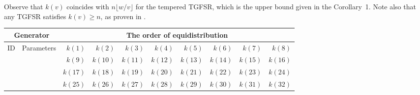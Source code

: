 Observe that $k(v)$ coincides
with $n\lfloor w/v \rfloor$ for the tempered TGFSR, which is the upper
bound given in the Corollary~1.
Note also that any TGFSR satisfies $k(v)\geq n$,
as proven in \cite{matsumoto}.
\vskip 5mm
\begin{center}
{\footnotesize
\begin{tabular}{|c|c|rrrr rrrr|}\hline
\multicolumn{2}{|c|}{Generator} & 
\multicolumn{8}{c|}{The order of equidistribution} \\ \hline
ID & Parameters
& 
$k(1)$&$k(2)$&$k(3)$&$k(4)$&$k(5)$&$k(6)$&$k(7)$&$k(8)$ \\
& & 
$k(9)$&$k(10)$&$k(11)$&$k(12)$&$k(13)$&$k(14)$&$k(15)$&$k(16)$ \\
& & 
$k(17)$&$k(18)$&$k(19)$&$k(20)$&$k(21)$&$k(22)$&$k(23)$&$k(24)$ \\
& & 
$k(25)$&$k(26)$&$k(27)$&$k(28)$&$k(29)$&$k(30)$&$k(31)$&$k(32)$ \\ \hline



\end{tabular}}
\end{center}
